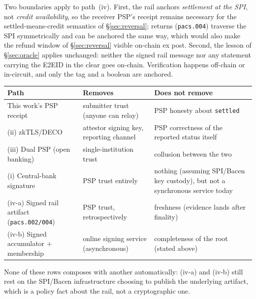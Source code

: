 \documentclass[11pt]{article}
\newcommand{\code}[1]{\texttt{#1}}
\begin{document}
Two boundaries apply to path~(iv). First, the rail anchors \emph{settlement at
the SPI}, not \emph{credit availability}, so the receiver PSP's receipt remains
necessary for the settled-means-credit semantics of \S\ref{sec:reversal};
returns (\code{pacs.004}) traverse the SPI symmetrically and can be anchored the
same way, which would also make the refund window of \S\ref{sec:reversal}
visible on-chain ex post. Second, the lesson of \S\ref{sec:oracle} applies
unchanged: neither the signed rail message nor any statement carrying the
E2EID in the clear goes on-chain. Verification happens off-chain or
in-circuit, and only the tag and a boolean are anchored.

\begin{center}
\small
\begin{tabular}{@{}p{}p{}p{}@{}}
\toprule
\textbf{Path} & \textbf{Removes} & \textbf{Does not remove} \\
\midrule
\raggedright This work's PSP receipt & submitter trust (anyone can relay) & PSP honesty about \code{settled} \\
\raggedright (ii) zkTLS/DECO & attestor signing key, reporting channel & PSP correctness of the reported status itself \\
\raggedright (iii) Dual PSP (open banking) & single-institution trust & collusion between the two \\
\raggedright (i) Central-bank signature & PSP trust entirely & nothing (assuming SPI/Bacen key custody), but not a synchronous service today \\
\raggedright (iv-a) Signed rail artifact (\code{pacs.002/004}) & PSP trust, retrospectively & freshness (evidence lands after finality) \\
\raggedright (iv-b) Signed accumulator + membership & online signing service (asynchronous) & completeness of the root (stated above) \\
\bottomrule
\end{tabular}
\end{center}
\noindent None of these rows composes with another automatically: (iv-a) and
(iv-b) still rest on the SPI/Bacen infrastructure choosing to publish the
underlying artifact, which is a policy fact about the rail, not a
cryptographic one.
\end{document}

